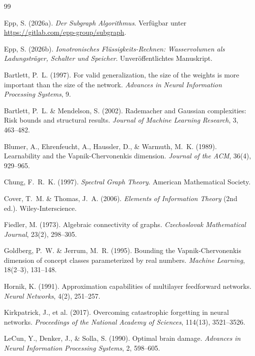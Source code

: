 \documentclass[12pt, a4paper, openany]{report}
\begin{document}
\begin{thebibliography}{99}

Epp, S. (2026a).
\newblock \textit{Der Subgraph Algorithmus}. Verfügbar unter \url{https://gitlab.com/epp-group/subgraph}.

Epp, S. (2026b).
\newblock \textit{Ionotronisches Flüssigkeits-Rechnen: Wasservolumen als Ladungsträger,
  Schalter und Speicher}. Unveröffentlichtes Manuskript.

Bartlett, P.~L. (1997).
For valid generalization, the size of the weights is more important than
the size of the network.
\textit{Advances in Neural Information Processing Systems}, 9.

Bartlett, P.~L. \& Mendelson, S. (2002).
Rademacher and Gaussian complexities: Risk bounds and structural results.
\textit{Journal of Machine Learning Research}, 3, 463--482.

Blumer, A., Ehrenfeucht, A., Haussler, D., \& Warmuth, M.~K. (1989).
Learnability and the Vapnik-Chervonenkis dimension.
\textit{Journal of the ACM}, 36(4), 929--965.

Chung, F.~R.~K. (1997).
\textit{Spectral Graph Theory}.
American Mathematical Society.

Cover, T.~M. \& Thomas, J.~A. (2006).
\textit{Elements of Information Theory} (2nd ed.).
Wiley-Interscience.

Fiedler, M. (1973).
Algebraic connectivity of graphs.
\textit{Czechoslovak Mathematical Journal}, 23(2), 298--305.

Goldberg, P.~W. \& Jerrum, M.~R. (1995).
Bounding the Vapnik-Chervonenkis dimension of concept classes
parameterized by real numbers.
\textit{Machine Learning}, 18(2--3), 131--148.

Hornik, K. (1991).
Approximation capabilities of multilayer feedforward networks.
\textit{Neural Networks}, 4(2), 251--257.

Kirkpatrick, J., et al. (2017).
Overcoming catastrophic forgetting in neural networks.
\textit{Proceedings of the National Academy of Sciences}, 114(13), 3521--3526.

LeCun, Y., Denker, J., \& Solla, S. (1990).
Optimal brain damage.
\textit{Advances in Neural Information Processing Systems}, 2, 598--605.


\end{thebibliography}
\end{document}

